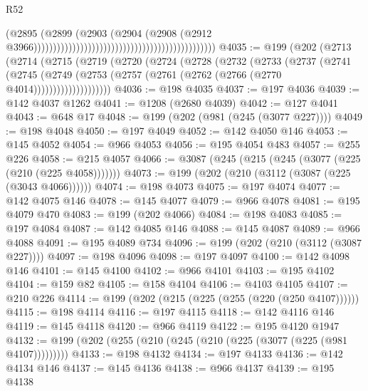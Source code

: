 \begin{lexlean}{R52}
\begin{coremodule}
                                                                                      (@2895
                                                                                        (@2899
                                                                                          (@2903
                                                                                            (@2904
                                                                                              (@2908
                                                                                                (@2912
                                                                                                  @3966)))))))))))))))))))))))))))))))))))))))))))))))
@4035 := @199
    (@202
      (@2713
        (@2714
          (@2715
            (@2719
              (@2720
                (@2724
                  (@2728
                    (@2732
                      (@2733
                        (@2737
                          (@2741
                            (@2745
                              (@2749
                                (@2753 (@2757 (@2761 (@2762 (@2766 (@2770 @4014))))))))))))))))))))
@4036 := @198 @4035
@4037 := @197 @4036
@4039 := @142 @4037 @1262
@4041 := @1208 (@2680 @4039)
@4042 := @127 @4041
@4043 := @648 @17
@4048 := @199 (@202 (@981 (@245 (@3077 @227))))
@4049 := @198 @4048
@4050 := @197 @4049
@4052 := @142 @4050 @146
@4053 := @145 @4052
@4054 := @966 @4053
@4056 := @195 @4054 @483
@4057 := @255 @226
@4058 := @215 @4057
@4066 := @3087 (@245 (@215 (@245 (@3077 (@225 (@210 (@225 @4058)))))))
@4073 := @199 (@202 (@210 (@3112 (@3087 (@225 (@3043 @4066))))))
@4074 := @198 @4073
@4075 := @197 @4074
@4077 := @142 @4075 @146
@4078 := @145 @4077
@4079 := @966 @4078
@4081 := @195 @4079 @470
@4083 := @199 (@202 @4066)
@4084 := @198 @4083
@4085 := @197 @4084
@4087 := @142 @4085 @146
@4088 := @145 @4087
@4089 := @966 @4088
@4091 := @195 @4089 @734
@4096 := @199 (@202 (@210 (@3112 (@3087 @227))))
@4097 := @198 @4096
@4098 := @197 @4097
@4100 := @142 @4098 @146
@4101 := @145 @4100
@4102 := @966 @4101
@4103 := @195 @4102
@4104 := @159 @82
@4105 := @158 @4104
@4106 := @4103 @4105
@4107 := @210 @226
@4114 := @199 (@202 (@215 (@225 (@255 (@220 (@250 @4107))))))
@4115 := @198 @4114
@4116 := @197 @4115
@4118 := @142 @4116 @146
@4119 := @145 @4118
@4120 := @966 @4119
@4122 := @195 @4120 @1947
@4132 := @199 (@202 (@255 (@210 (@245 (@210 (@225 (@3077 (@225 (@981 @4107)))))))))
@4133 := @198 @4132
@4134 := @197 @4133
@4136 := @142 @4134 @146
@4137 := @145 @4136
@4138 := @966 @4137
@4139 := @195 @4138

\end{coremodule}
\end{lexlean}
